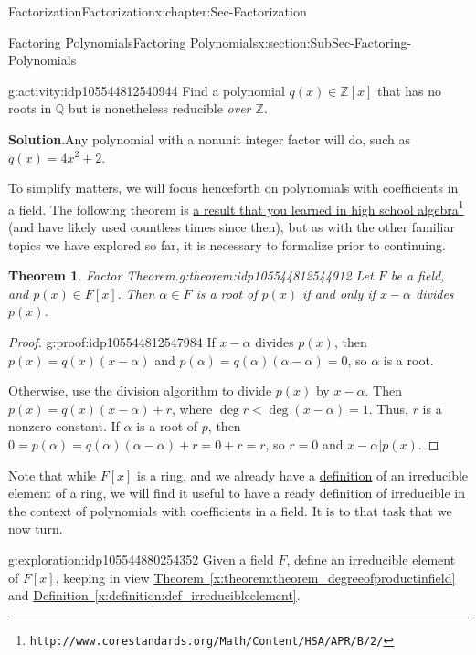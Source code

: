 \documentclass[oneside,10pt,]{book}
\newcommand{\blocktitlefont}{\relax}
\newcommand{\xreffont}{\relax}
\numberwithin{equation}{section}
\def\Z{{\mathbb Z}}
\def\Q{{\mathbb Q}}
\newtheorem{theorem}{Theorem}[section]
\newcommand{\lt}{<}
\begin{document}
\begin{chapterptx}{Factorization}{}{Factorization}{}{}{x:chapter:Sec-Factorization}
\begin{sectionptx}{Factoring Polynomials}{}{Factoring Polynomials}{}{}{x:section:SubSec-Factoring-Polynomials}
\begin{activity}{}{g:activity:idp105544812540944}%
Find a polynomial \(q(x) \in \Z[x]\) that has no roots in \(\Q\) but is nonetheless reducible \emph{over \(\Z\)}.%
\par\smallskip%
\noindent\textbf{\blocktitlefont Solution}.\hypertarget{g:solution:idp105544812543120}{}\quad{}Any polynomial with a nonunit integer factor will do, such as \(q(x) = 4x^2 + 2\).%
\end{activity}%
To simplify matters, we will focus henceforth on polynomials with coefficients in a field. The following theorem is \href{http://www.corestandards.org/Math/Content/HSA/APR/B/2/}{a result that you learned in high school algebra}\footnote{\nolinkurl{http://www.corestandards.org/Math/Content/HSA/APR/B/2/}\label{g:fn:idp105544812544528}} (and have likely used countless times since then), but as with the other familiar topics we have explored so far, it is necessary to formalize prior to continuing.%
\begin{theorem}{Factor Theorem.}{}{g:theorem:idp105544812544912}%
Let \(F\) be a field, and \(p(x)\in F[x]\). Then \(\alpha\in F\) is a root of \(p(x)\) if and only if \(x-\alpha\) divides \(p(x)\).%
\end{theorem}
\begin{proof}{}{g:proof:idp105544812547984}
If \(x-\alpha\) divides \(p(x)\), then \(p(x) = q(x) (x-\alpha)\) and \(p(\alpha) = q(\alpha) (\alpha - \alpha) = 0\), so \(\alpha\) is a root.%
\par
Otherwise, use the division algorithm to divide \(p(x)\) by \(x-\alpha\). Then \(p(x) = q(x)(x-\alpha) + r\), where \(\deg r \lt \deg (x-\alpha) = 1\). Thus, \(r\) is a nonzero constant. If \(\alpha\) is a root of \(p\), then \(0 = p(\alpha) = q(\alpha) (\alpha - \alpha) + r = 0 + r = r\), so \(r=0\) and \(x-\alpha | p(x)\).%
\end{proof}
Note that while \(F[x]\) is a ring, and we already have a \hyperref[x:definition:def_irreducibleelement]{definition} of an irreducible element of a ring, we will find it useful to have a ready definition of irreducible in the context of polynomials with coefficients in a field. It is to that task that we now turn.%
\begin{exploration}{}{g:exploration:idp105544880254352}%
%
Given a field \(F\), define an irreducible element of \(F[x]\), keeping in view \hyperref[x:theorem:theorem_degreeofproductinfield]{Theorem~{\xreffont\ref{x:theorem:theorem_degreeofproductinfield}}} and \hyperref[x:definition:def_irreducibleelement]{Definition~{\xreffont\ref{x:definition:def_irreducibleelement}}}. \par\smallskip%

\end{exploration}
\end{sectionptx}
\end{chapterptx}
\end{document}
